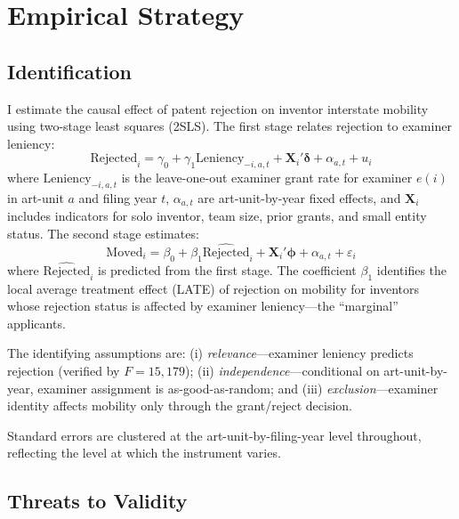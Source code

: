 \documentclass[12pt]{article}
\begin{document}


\section{Empirical Strategy}
\label{sec:strategy}

\subsection{Identification}

I estimate the causal effect of patent rejection on inventor interstate mobility using two-stage least squares (2SLS). The first stage relates rejection to examiner leniency:
\begin{equation}
\text{Rejected}_{i} = \gamma_0 + \gamma_1 \text{Leniency}_{-i,a,t} + \mathbf{X}_i'\boldsymbol{\delta} + \alpha_{a,t} + u_i
\label{eq:fs}
\end{equation}
where $\text{Leniency}_{-i,a,t}$ is the leave-one-out examiner grant rate for examiner $e(i)$ in art-unit $a$ and filing year $t$, $\alpha_{a,t}$ are art-unit-by-year fixed effects, and $\mathbf{X}_i$ includes indicators for solo inventor, team size, prior grants, and small entity status. The second stage estimates:
\begin{equation}
\text{Moved}_{i} = \beta_0 + \beta_1 \widehat{\text{Rejected}}_{i} + \mathbf{X}_i'\boldsymbol{\phi} + \alpha_{a,t} + \varepsilon_i
\label{eq:ss}
\end{equation}
where $\widehat{\text{Rejected}}_{i}$ is predicted from the first stage. The coefficient $\beta_1$ identifies the local average treatment effect (LATE) of rejection on mobility for inventors whose rejection status is affected by examiner leniency---the ``marginal'' applicants.

The identifying assumptions are: (i) \textit{relevance}---examiner leniency predicts rejection (verified by $F = 15{,}179$); (ii) \textit{independence}---conditional on art-unit-by-year, examiner assignment is as-good-as-random; and (iii) \textit{exclusion}---examiner identity affects mobility only through the grant/reject decision.

Standard errors are clustered at the art-unit-by-filing-year level throughout, reflecting the level at which the instrument varies.

\subsection{Threats to Validity}
\label{sec:threats}
\end{document}
